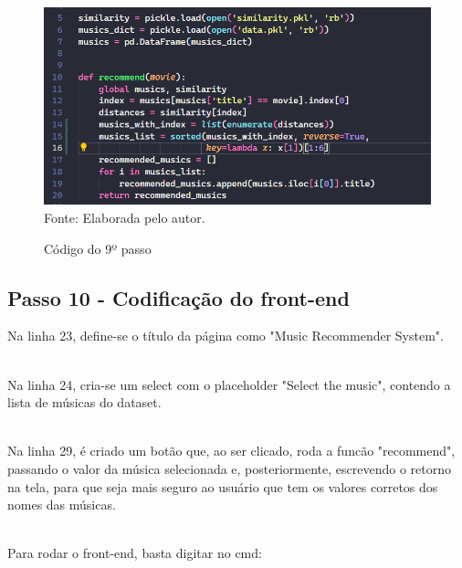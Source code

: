 \documentclass[a4paper, 12pt]{article}
\begin{document}
 \begin{figure}[!ht]
        \centering
        \caption{Código do 9º passo}
        \includegraphics[scale=0.5]{9passo.png} \\
        {\footnotesize Fonte: Elaborada pelo autor.}
        \label{fig:my_label}
    \end{figure}
    
\newpage

\subsection{Passo 10 - Codificação do front-end}
Na linha 23, define-se o título da página como "Music Recommender System".

\\Na linha 24, cria-se um select com o placeholder "Select the music", contendo a lista de músicas do dataset.

\\Na linha 29, é criado um botão que, ao ser clicado, roda a funcão "recommend", passando o valor da música selecionada e, posteriormente,
escrevendo o retorno na tela, para que seja mais seguro ao usuário que tem os valores corretos dos nomes das músicas.

\\Para rodar o front-end, basta digitar no cmd:

\\\\
\end{document}
